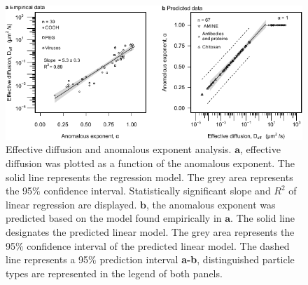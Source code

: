 \documentclass[aps,prl,preprint,superscriptaddress,showkeys,linenumbers]{revtex4-1}
\begin{document}
\clearpage

\begin{figure}
\centering
\includegraphics[width = 15 cm]{Figure_difvalp.pdf}
\caption{Effective diffusion and anomalous exponent analysis. $\textbf{a}$, effective diffusion was plotted as a function of the anomalous exponent. The solid line represents the regression model. The grey area represents the 95$\%$ confidence interval. Statistically significant slope and $R^2$ of linear regression are displayed. $\textbf{b}$, the anomalous exponent was predicted based on the model found empirically in $\textbf{a}$. The solid line designates the predicted linear model. The grey area represents the 95$\%$ confidence interval of the predicted linear model. The dashed line represents a 95$\%$ prediction interval \textbf{a-b}, distinguished particle types are represented in the legend of both panels.
}
\label{fig:difvalph}
\end{figure}  

\clearpage
\end{document}
